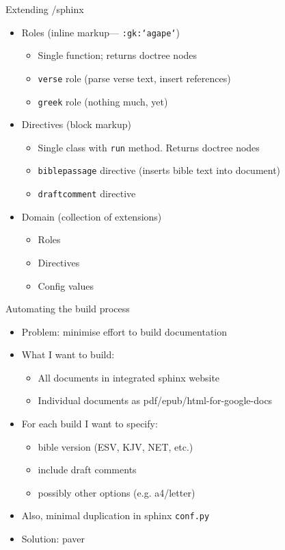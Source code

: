 \documentclass{beamer}
\begin{document}
\begin{frame}{Extending \rst/sphinx}

\begin{itemize}
\item Roles (inline markup--- \texttt{:gk:`agape`})
\begin{itemize}
\item Single function; returns doctree nodes
\item \texttt{verse} role (parse verse text, insert references)
\item \texttt{greek} role (nothing much, yet)
\end{itemize}
\item Directives (block markup)
\begin{itemize}
\item Single class with \texttt{run} method. Returns doctree nodes
\item \texttt{biblepassage} directive (inserts bible text into document)
\item \texttt{draftcomment} directive
\end{itemize}
\item Domain (collection of extensions)
\begin{itemize}
\item Roles
\item Directives
\item Config values
\end{itemize}
\end{itemize}

\end{frame}

\begin{frame}{Automating the build process}
\begin{itemize}
\item Problem: minimise effort to build documentation

\item What I want to build:
\begin{itemize}
\item All documents in integrated sphinx website
\item Individual documents as pdf/epub/html-for-google-docs
\end{itemize}
\item For each build I want to specify:
\begin{itemize}
\item bible version (ESV, KJV, NET, etc.)
\item include draft comments
\item possibly other options (e.g. a4/letter)
\end{itemize}
\item Also, minimal duplication in sphinx \texttt{conf.py}\\

\item Solution: paver
\end{itemize}
\end{frame}
\end{document}
